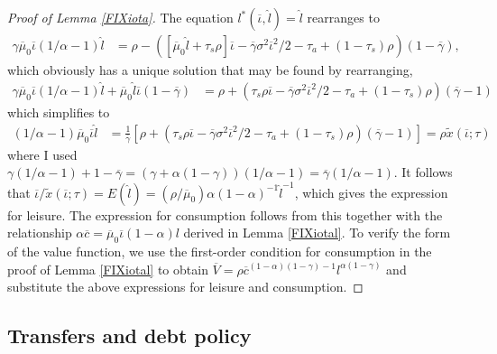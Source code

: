 \documentclass[11pt]{article}
\theoremstyle{plain}
\begin{document}
\begin{proof}[Proof of Lemma \ref{FIXiota}]
The equation $l^*(\overline{\iota}, \hat{l}) = \hat{l}$ rearranges to 
\begin{align*}
\gamma\overline{\mu}_0\overline{\iota}(1/\alpha-1)\hat{l} & = \rho - {\left([\overline{\mu}_0\hat{l} + \tau_s\rho]\overline{\iota} - \overline{\gamma}\sigma^2\overline{\iota}^2/2 - \tau_a + (1-\tau_s)\rho\right)}(1 - \overline{\gamma}),
\end{align*}
which obviously has a unique solution that may be found by rearranging,
\begin{align*}
\gamma\overline{\mu}_0\overline{\iota}(1/\alpha-1)\hat{l} + \overline{\mu}_0\hat{l}\overline{\iota}(1 - \overline{\gamma}) & = \rho + {\left( \tau_s\rho\overline{\iota} - \overline{\gamma}\sigma^2\overline{\iota}^2/2 - \tau_a + (1-\tau_s)\rho\right)}( \overline{\gamma}-1)
\end{align*}
which simplifies to
\begin{align*}
(1/\alpha-1)\overline{\mu}_0\overline{\iota}\hat{l} & = \frac{1}{\overline{\gamma}}{\left[\rho + {\left( \tau_s\rho\overline{\iota} - \overline{\gamma}\sigma^2\overline{\iota}^2/2 - \tau_a + (1-\tau_s)\rho\right)}( \overline{\gamma}-1)\right]} = \rho \tilde{x}(\overline{\iota};\tau)
\end{align*}
where I used $\gamma(1/\alpha-1) + 1 - \overline{\gamma} = {\left(\gamma + \alpha(1 - \gamma)\right)}(1/\alpha - 1) = \overline{\gamma}(1/\alpha - 1)$. It follows that $\overline{\iota}/\tilde{x}(\overline{\iota};\tau) = E(\hat{l}) = (\rho/\overline{\mu}_0) \alpha(1-\alpha)^{-1}\hat{l}^{-1}$, which gives the expression for leisure. The expression for consumption follows from this together with the relationship $\alpha \overline{c} = \overline{\mu}_0\overline{\iota}(1 - \alpha)l$ derived in Lemma \ref{FIXiotal}. To verify the form of the value function, we use the first-order condition for consumption in the proof of Lemma \ref{FIXiotal} to obtain $\overline{V} = \rho\overline{c}^{(1-\alpha)(1-\gamma)-1}l^{\alpha(1-\gamma)}$ and substitute the above expressions for leisure and consumption. 
\end{proof}



\subsection{Transfers and debt policy} \label{debt_pol}
\end{document}
